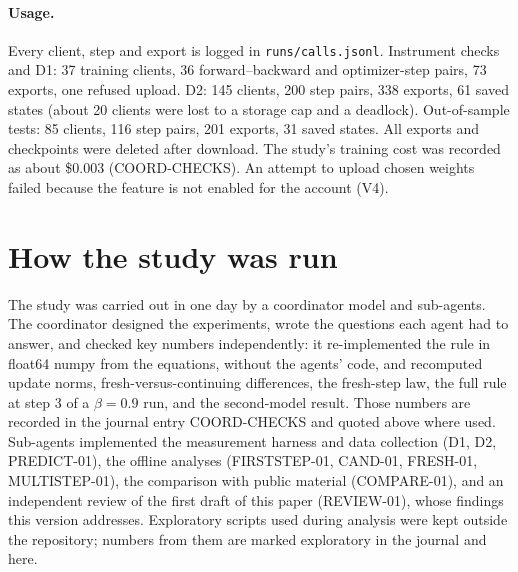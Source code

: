 \documentclass[11pt]{article}
\begin{document}
\paragraph{Usage.} Every client, step and export is logged in \texttt{runs/calls.jsonl}. Instrument
checks and D1: 37 training clients, 36 forward--backward and optimizer-step pairs, 73 exports, one
refused upload. D2: 145 clients, 200 step pairs, 338 exports, 61 saved states (about 20 clients were
lost to a storage cap and a deadlock). Out-of-sample tests: 85 clients, 116 step pairs, 201 exports, 31
saved states. All exports and checkpoints were deleted after download. The study's training cost was
recorded as about \$0.003 (COORD-CHECKS). An attempt to upload chosen weights failed because the
feature is not enabled for the account (V4).

\section{How the study was run}\label{app:how}
The study was carried out in one day by a coordinator model and sub-agents. The coordinator designed
the experiments, wrote the questions each agent had to answer, and checked key numbers independently:
it re-implemented the rule in float64 numpy from the equations, without the agents' code, and recomputed
update norms, fresh-versus-continuing differences, the fresh-step law, the full rule at step 3 of a
$\beta=0.9$ run, and the second-model result. Those numbers are recorded in the journal entry
COORD-CHECKS and quoted above where used. Sub-agents implemented the measurement harness and data
collection (D1, D2, PREDICT-01), the offline analyses (FIRSTSTEP-01, CAND-01, FRESH-01, MULTISTEP-01),
the comparison with public material (COMPARE-01), and an independent review of the first draft of this
paper (REVIEW-01), whose findings this version addresses. Exploratory scripts used during analysis were
kept outside the repository; numbers from them are marked exploratory in the journal and here.
\end{document}
